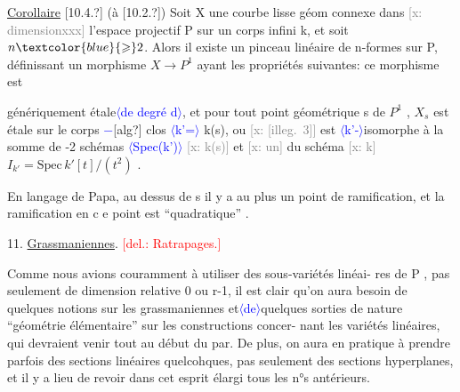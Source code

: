 \documentclass[11pt]{article}
\newcommand{\scanpage}[1]{\par\bigskip\noindent{\small\sffamily[scan #1]}\par}
\newcommand{\mspage}[1]{{\small\sffamily[p.\,#1]}}
\newcommand{\hand}[1]{\textcolor{blue}{#1}}
\let\over\relax
\newcommand{\over}[2]{\textcolor{gray}{#1}\textcolor{blue}{\ensuremath{^{\!\nearrow}}#2}}
\newcommand{\inserted}[2][]{\textcolor{blue}{$\langle$#2$\rangle$}}
\newcommand{\deleted}[1]{\textcolor{red}{[\textsf{del.:} #1]}}
\newcommand{\xout}[1]{\textcolor{gray}{[\textsf{x:} #1]}}
\newcommand{\uline}[1]{\underline{#1}}
\newcommand{\unsure}[1]{[#1?]}
\newcommand{\illegible}[1]{[\textsf{illeg.\ #1}]}
\begin{document}
\uline{Corollaire} \unsure{10.4.} (à \unsure{10.2.}) Soit X une courbe lisse géom connexe dans
\xout{dimensionxxx} l'espace projectif P sur un corps infini k, et soit $n\hand{\geqslant}2$.
Alors il existe un pinceau linéaire de n-formes sur P, définissant un
morphisme $X\to P^1$ ayant les propriétés suivantes: ce morphisme est

\mspage{61}

\clearpage
\scanpage{25/62}
\mspage{57}

génériquement étale\inserted[typed]{de degré \hand{d}}, et pour tout point géométrique  s de $P^1$ ,  $X_s$
est étale sur le corps \hand{$-$}\unsure{alg} clos \inserted{k'=} k(s), ou  \xout{\illegible{3}} est
\inserted{k'-}isomorphe à la somme de \over{\unsure{n}}{d}-2  schémas \inserted{Spec(k')} \xout{k(s)}  et \xout{un}  du schéma  \xout{k}
$I_{k'} = \mathrm{Spec}\, k'[t]/(t^2)$ .

En langage de Papa, au  dessus de s  il y a au plus un point de
ramification, et la ramification en c e point est ``quadratique'' .

11.  \uline{Grassmaniennes}. \deleted{Ratrapages.}

Comme nous avions couramment à utiliser des sous-variétés linéai-%
res de P , pas seulement de dimension relative 0 ou r-1, il est clair
qu'on aura besoin de quelques notions sur les grassmaniennes  et\inserted{de}quelques
sorties de nature ``géométrie élémentaire'' sur les constructions concer-%
nant les variétés linéaires, qui  devraient venir tout au début du par.
De plus, on aura en pratique à prendre parfois des sections linéaires
quelcohques, pas seulement des sections hyperplanes, et il y a lieu de
revoir dans cet esprit élargi tous les n°s antérieurs.
\end{document}
